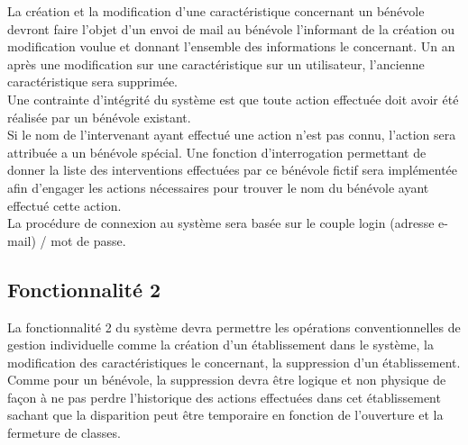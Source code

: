 La création et la modification d'une caractéristique concernant un bénévole devront faire l'objet d'un envoi de mail au bénévole l'informant de la création ou modification voulue et donnant l'ensemble des informations le concernant. Un an après une modification sur une caractéristique sur un utilisateur, l'ancienne caractéristique sera supprimée. \\


Une contrainte d'intégrité du système est que toute action effectuée doit avoir été réalisée par un bénévole existant. \\
Si le nom de l'intervenant ayant effectué une action n'est pas connu, l'action sera attribuée a un bénévole spécial. Une fonction d'interrogation permettant de donner la liste des interventions effectuées par ce bénévole fictif sera implémentée afin d'engager les actions nécessaires pour trouver le nom du bénévole ayant effectué cette action. \\


La procédure de connexion au système sera basée sur le couple login (adresse e-mail) / mot de passe.




\subsection{Fonctionnalité 2}
La fonctionnalité 2 du système devra permettre les opérations conventionnelles de gestion individuelle comme la création d'un établissement dans le système, la modification des
caractéristiques le concernant, la suppression d'un établissement. Comme pour un bénévole, la suppression devra être logique et non physique de façon à ne pas perdre l'historique des actions effectuées dans cet établissement sachant que la disparition peut être temporaire en fonction de l'ouverture et la fermeture de classes. \\



